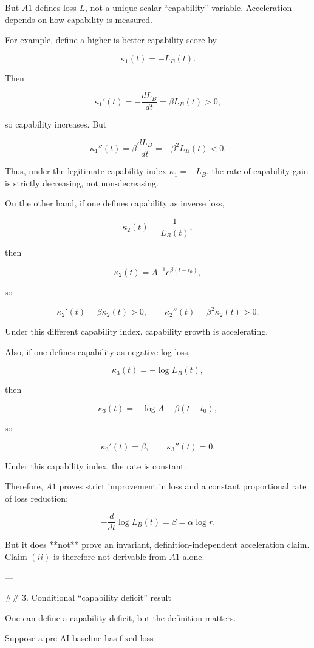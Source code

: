 But $A1$ defines loss $L$, not a unique scalar “capability” variable. Acceleration depends on how capability is measured.

For example, define a higher-is-better capability score by

\[
\kappa_1(t)=-L_B(t).
\]

Then

\[
\kappa_1'(t)
=
-\frac{dL_B}{dt}
=
\beta L_B(t)>0,
\]

so capability increases. But

\[
\kappa_1''(t)
=
\beta \frac{dL_B}{dt}
=
-\beta^2L_B(t)<0.
\]

Thus, under the legitimate capability index $\kappa_1=-L_B$, the rate of capability gain is strictly decreasing, not non-decreasing.

On the other hand, if one defines capability as inverse loss,

\[
\kappa_2(t)=\frac{1}{L_B(t)},
\]

then

\[
\kappa_2(t)=A^{-1}e^{\beta(t-t_0)},
\]

so

\[
\kappa_2'(t)=\beta \kappa_2(t)>0,
\qquad
\kappa_2''(t)=\beta^2\kappa_2(t)>0.
\]

Under this different capability index, capability growth is accelerating.

Also, if one defines capability as negative log-loss,

\[
\kappa_3(t)=-\log L_B(t),
\]

then

\[
\kappa_3(t)
=
-\log A+\beta(t-t_0),
\]

so

\[
\kappa_3'(t)=\beta,
\qquad
\kappa_3''(t)=0.
\]

Under this capability index, the rate is constant.

Therefore, $A1$ proves strict improvement in loss and a constant proportional rate of loss reduction:

\[
-\frac{d}{dt}\log L_B(t)=\beta=\alpha\log r.
\]

But it does **not** prove an invariant, definition-independent acceleration claim. Claim $(ii)$ is therefore not derivable from $A1$ alone.

---

## 3. Conditional “capability deficit” result

One can define a capability deficit, but the definition matters.

Suppose a pre-AI baseline has fixed loss

